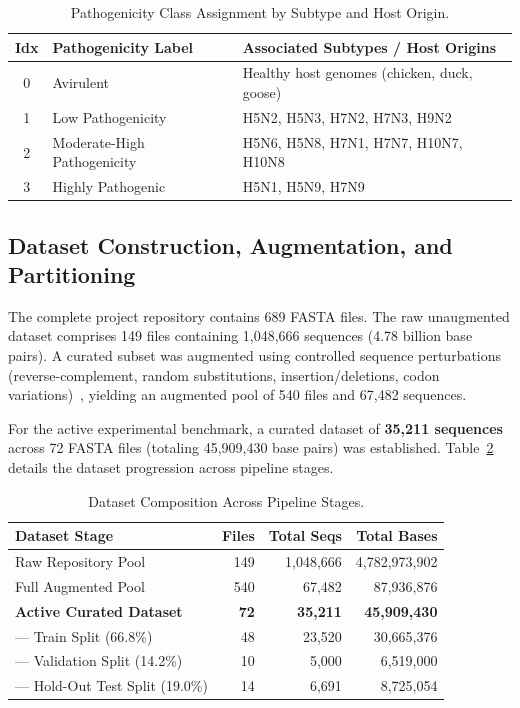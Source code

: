 \documentclass[conference]{IEEEtran}
\begin{document}
\begin{table}[t]
\centering
\caption{Pathogenicity Class Assignment by Subtype and Host Origin.}
\label{tab:subtype_mapping}
\footnotesize
\begin{tabularx}{\columnwidth}{@{}c l X@{}}
\toprule
\textbf{Idx} & \textbf{Pathogenicity Label} & \textbf{Associated Subtypes / Host Origins} \\
\midrule
0 & Avirulent & Healthy host genomes (chicken, duck, goose) \\
1 & Low Pathogenicity & H5N2, H5N3, H7N2, H7N3, H9N2 \\
2 & Moderate-High Pathogenicity & H5N6, H5N8, H7N1, H7N7, H10N7, H10N8 \\
3 & Highly Pathogenic & H5N1, H5N9, H7N9 \\
\bottomrule
\end{tabularx}
\end{table}

\subsection{Dataset Construction, Augmentation, and Partitioning}
The complete project repository contains 689 FASTA files. The raw unaugmented dataset comprises 149 files containing 1,048,666 sequences (4.78 billion base pairs). A curated subset was augmented using controlled sequence perturbations (reverse-complement, random substitutions, insertion/deletions, codon variations)~\cite{chawla2002smote}, yielding an augmented pool of 540 files and 67,482 sequences.

For the active experimental benchmark, a curated dataset of \textbf{35,211 sequences} across 72 FASTA files (totaling 45,909,430 base pairs) was established. Table~\ref{tab:dataset_composition} details the dataset progression across pipeline stages.

\begin{table}[t]
\centering
\caption{Dataset Composition Across Pipeline Stages.}
\label{tab:dataset_composition}
\footnotesize
\begin{tabularx}{\columnwidth}{@{}X r r r@{}}
\toprule
\textbf{Dataset Stage} & \textbf{Files} & \textbf{Total Seqs} & \textbf{Total Bases} \\
\midrule
Raw Repository Pool & 149 & 1,048,666 & 4,782,973,902 \\
Full Augmented Pool & 540 & 67,482 & 87,936,876 \\
\textbf{Active Curated Dataset} & \textbf{72} & \textbf{35,211} & \textbf{45,909,430} \\
--- Train Split (66.8\%) & 48 & 23,520 & 30,665,376 \\
--- Validation Split (14.2\%) & 10 & 5,000 & 6,519,000 \\
--- Hold-Out Test Split (19.0\%) & 14 & 6,691 & 8,725,054 \\
\bottomrule
\end{tabularx}
\end{table}
\end{document}
